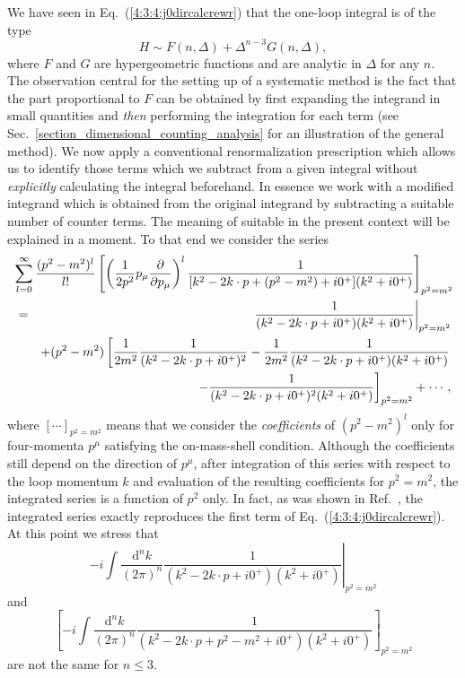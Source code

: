 \documentclass[twoside,12pt]{article}
\begin{document}
   We have seen in Eq.\ (\ref{4:3:4:j0dircalcrewr}) that the one-loop integral
is of the type
\begin{displaymath}
H\sim F(n,\Delta)+\Delta^{n-3}G(n,\Delta),
\end{displaymath}
where $F$ and $G$ are hypergeometric functions and are analytic in $\Delta$ for
any $n$.
   The observation central for the setting up of a systematic method is the fact
that the part proportional to $F$ can be obtained by first expanding
the integrand in small quantities and {\em then} performing the integration
for each term \cite{Gegelia:1994zz} (see Sec.\ \ref{section_dimensional_counting_analysis}
for an illustration of the general method).
   We now apply a conventional renormalization prescription which allows us to identify
those terms which we subtract from a given integral without {\em explicitly}
calculating the integral beforehand.
   In essence we work with a modified integrand which is obtained from
the original integrand by subtracting a suitable number of
counter terms.
   The meaning of suitable in the present context will be explained in
a moment.
   To that end we consider the series
\begin{eqnarray}
\label{4:3:4:series}
\lefteqn{
\sum_{l=0}^\infty \frac{(p^2-m^2)^l}{l!}\left[
\left(\frac{1}{2p^2}p_\mu\frac{\partial}{\partial p_\mu}\right)^l
\frac{1}{[k^2-2k\cdot p+(p^2-m^2)+i0^+](k^2+i0^+)}\right]_{p^2=m^2}}\nonumber\\
&=&\left.\frac{1}{(k^2-2k\cdot p+i0^+)(k^2+i0^+)}\right|_{p^2=m^2}\nonumber\\
&&+(p^2-m^2)\left[\frac{1}{2m^2}\frac{1}{(k^2-2k\cdot p+i0^+)^2}
-\frac{1}{2m^2}\frac{1}{(k^2-2k\cdot p+i0^+)(k^2+i0^+)}\right.\nonumber\\
&&\left. -\frac{1}{(k^2-2k\cdot p+i0^+)^2(k^2+i0^+)}
\right]_{p^2=m^2}+\cdots,
\end{eqnarray}
   where $[\cdots ]_{p^2=m^2}$ means that we consider the {\em coefficients}
of $(p^2-m^2)^l$ only for four-momenta $p^\mu$ satisfying the on-mass-shell
condition.
   Although the coefficients still depend on the direction of $p^\mu$,
after integration of this series with respect to the loop momentum $k$ and
evaluation of the resulting coefficients for $p^2=m^2$, the integrated series
is a function of $p^2$ only.
   In fact, as was shown in Ref.\ \cite{Gegelia:1994zz}, the integrated
series exactly reproduces the first term of  Eq.\ (\ref{4:3:4:j0dircalcrewr}).
   At this point we stress that
\begin{displaymath}
\left.
-i\int \frac{\mbox{d}^n k}{(2\pi)^n}
\frac{1}{(k^2-2k\cdot p+i0^+)(k^2+i0^+)}\right|_{p^2=m^2}
\end{displaymath}
and
\begin{displaymath}
\left[-i\int \frac{\mbox{d}^n k}{(2\pi)^n}
\frac{1}{(k^2-2k\cdot p+p^2-m^2+ i0^+)(k^2+i0^+)}\right]_{p^2=m^2}
\end{displaymath}
are not the same for $n\leq 3$.
\end{document}
